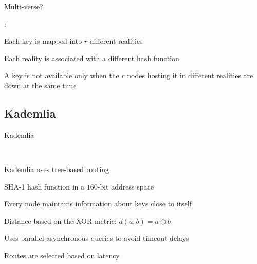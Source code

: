 \begin{frame}{Multi-verse?}

:
\BIL
\item Each key is mapped into $r$ different \alert{realities}
\item Each reality is associated with a different hash function
\item A key is not available only when the $r$ nodes hosting it in different
  realities are down at the same time
\EIL
	
\end{frame}



\subsection{Kademlia}

\begin{frame}{Kademlia}
	
\\
\BI
\item Kademlia uses tree-based routing
\item SHA-1 hash function in a $160$-bit address space
\item Every node maintains information about keys \alert{close} to itself 
	\BI
	\item Distance based on the XOR metric: $d(a,b) = a \oplus b$
	\EI
\item Uses parallel asynchronous queries to avoid timeout delays
\item Routes are selected based on latency
\EI

\begin{Bib}
{\scriptsize
}
\end{Bib}
	
	
\end{frame}

